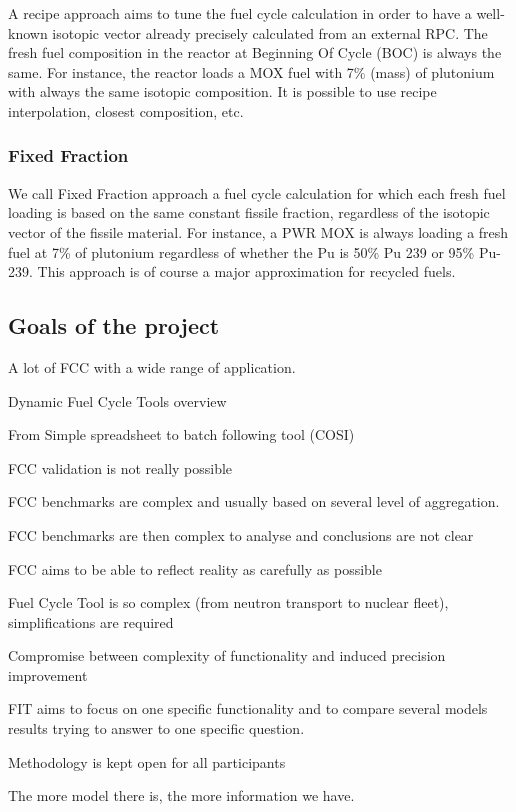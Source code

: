 \documentclass[review]{elsarticle}
\begin{document}
A recipe approach aims to tune the fuel cycle calculation in order to have a well-known isotopic vector already precisely calculated from an external RPC. The fresh fuel composition in the reactor at Beginning Of Cycle (BOC) is always the same. For instance, the reactor loads a MOX fuel with 7\% (mass) of plutonium with always the same isotopic composition. It is possible to use recipe interpolation, closest composition, etc.  

\subsubsection{Fixed Fraction}

We call Fixed Fraction approach a fuel cycle calculation for which each fresh fuel loading is based on the same constant fissile fraction, regardless of the isotopic vector of the fissile material. For instance, a PWR MOX is always loading a fresh fuel at 7\% of plutonium regardless of whether the Pu is 50\% Pu 239 or 95\% Pu-239. This approach is of course a major approximation for recycled fuels.

\subsection{Goals of the project}

A lot of FCC with a wide range of application. 

Dynamic Fuel Cycle Tools overview

From Simple spreadsheet to batch following tool (COSI)

FCC validation is not really possible

FCC benchmarks are complex and usually based on several level of aggregation. 

FCC benchmarks are then complex to analyse and conclusions are not clear

FCC aims to be able to reflect reality as carefully as possible

Fuel Cycle Tool is so complex (from neutron transport to nuclear fleet), simplifications are required

Compromise between complexity of functionality and induced precision improvement

FIT aims to focus on one specific functionality and to compare several models results trying to answer to one specific question. 

Methodology is kept open for all participants

The more model there is, the more information we have.
\end{document}
